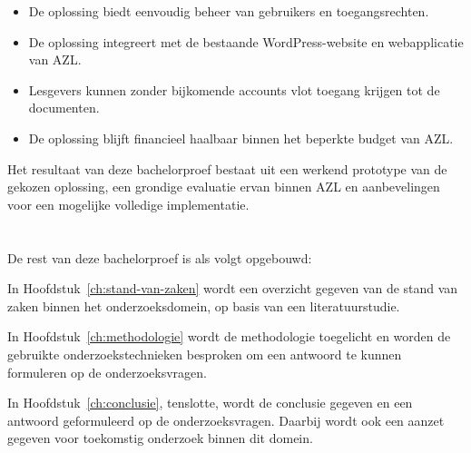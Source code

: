 \begin{itemize}
  \item De oplossing biedt eenvoudig beheer van gebruikers en toegangsrechten.
  \item De oplossing integreert met de bestaande WordPress-website en webapplicatie van AZL.
  \item Lesgevers kunnen zonder bijkomende accounts vlot toegang krijgen tot de documenten.
  \item De oplossing blijft financieel haalbaar binnen het beperkte budget van AZL.
\end{itemize}

Het resultaat van deze bachelorproef bestaat uit een werkend prototype van de gekozen oplossing, een grondige evaluatie ervan binnen AZL en aanbevelingen voor een mogelijke volledige implementatie.

\section{}%
\label{sec:opzet-bachelorproef}


De rest van deze bachelorproef is als volgt opgebouwd:

In Hoofdstuk~\ref{ch:stand-van-zaken} wordt een overzicht gegeven van de stand van zaken binnen het onderzoeksdomein, op basis van een literatuurstudie.

In Hoofdstuk~\ref{ch:methodologie} wordt de methodologie toegelicht en worden de gebruikte onderzoekstechnieken besproken om een antwoord te kunnen formuleren op de onderzoeksvragen.


In Hoofdstuk~\ref{ch:conclusie}, tenslotte, wordt de conclusie gegeven en een antwoord geformuleerd op de onderzoeksvragen. Daarbij wordt ook een aanzet gegeven voor toekomstig onderzoek binnen dit domein.